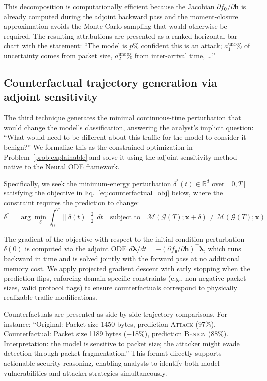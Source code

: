 \documentclass[preprint,review,12pt]{elsarticle}
\newcommand{\vx}{\mathbf{x}}            %
\newcommand{\vh}{\mathbf{h}}            %
\newcommand{\vlambda}{\boldsymbol{\lambda}} %
\newcommand{\vtheta}{\boldsymbol{\theta}} %
\newcommand{\R}{\mathbb{R}}
\newcommand{\calG}{\mathcal{G}}
\newcommand{\calM}{\mathcal{M}}
\begin{document}
This decomposition is computationally efficient because the Jacobian $\partial f_{\vtheta} / \partial \vh$ is already computed during the adjoint backward pass and the moment-closure approximation avoids the Monte Carlo sampling that would otherwise be required. The resulting attributions are presented as a ranked horizontal bar chart with the statement: ``The model is $p$\% confident this is an attack; $a_1^{\mathrm{unc}}$\% of uncertainty comes from packet size, $a_2^{\mathrm{unc}}$\% from inter-arrival time, \ldots''

\subsection{Counterfactual trajectory generation via adjoint sensitivity}
\label{subsec:counterfactual}

The third technique generates the minimal continuous-time perturbation that would change the model's classification, answering the analyst's implicit question: ``What would need to be different about this traffic for the model to consider it benign?'' We formalize this as the constrained optimization in Problem~\ref{prob:explainable} and solve it using the adjoint sensitivity method native to the Neural ODE framework.

Specifically, we seek the minimum-energy perturbation $\delta^*(t) \in \R^d$ over $[0, T]$ satisfying the objective in Eq.~\eqref{eq:counterfactual_obj} below, where the constraint requires the prediction to change:
\begin{equation}\label{eq:counterfactual_obj}
    \delta^* = \arg\min_{\delta} \int_0^T \!\|\delta(t)\|_2^2 \, dt \quad \text{subject to} \quad \calM(\calG(T); \vx + \delta) \neq \calM(\calG(T); \vx)
\end{equation}

The gradient of the objective with respect to the initial-condition perturbation $\delta(0)$ is computed via the adjoint ODE $d\vlambda / dt = -(\partial f_{\vtheta} / \partial \vh)^\top \vlambda$, which runs backward in time and is solved jointly with the forward pass at no additional memory cost. We apply projected gradient descent with early stopping when the prediction flips, enforcing domain-specific constraints (e.g., non-negative packet sizes, valid protocol flags) to ensure counterfactuals correspond to physically realizable traffic modifications.

Counterfactuals are presented as side-by-side trajectory comparisons. For instance: ``Original: Packet size 1450 bytes, prediction \textsc{Attack} (97\%). Counterfactual: Packet size 1189 bytes ($-$18\%), prediction \textsc{Benign} (88\%). Interpretation: the model is sensitive to packet size; the attacker might evade detection through packet fragmentation.'' This format directly supports actionable security reasoning, enabling analysts to identify both model vulnerabilities and attacker strategies simultaneously.
\end{document}
